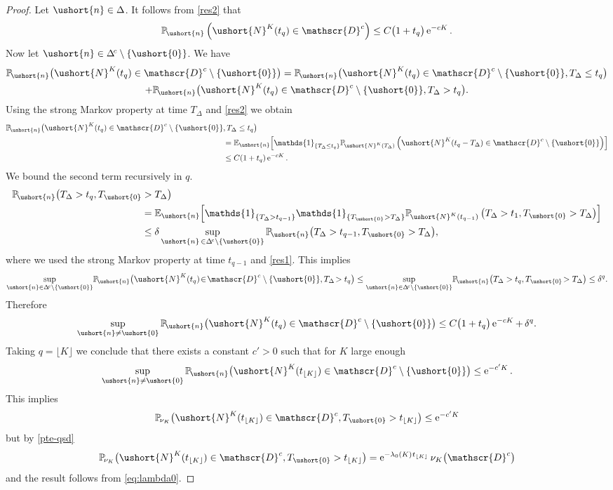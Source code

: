\documentclass[JEP,XML,SOM,Unicode]{cedram}
\newcommand{\scaleto}[2]{#1}
\let\backslash\setminus
\let\mathcal\mathscr
\numberwithin{equation}{section}
\theoremstyle{plain}
\theoremstyle{definition}
\newcommand{\proba}{{\mathbb{P}}}
\newcommand{\E}{{\mathbb{E}}}
\newcommand{\un}{\mathds{1}}
\newcommand{\vecn}{\ushort{n}}
\newcommand{\veczer}{\ushort{0}}
\newcommand{\sDelta}{\Delta}
\newcommand{\ssDelta}{\Delta}
\newcommand{\leproc}{\ushort{N}^{K}}
\newcommand{\sleproc}{\ushort{N}^{K}}
\newcommand{\nuk}{\nu_{K}}\let\snuk\nuk
\newcommand{\e}{\operatorname{e}}
\begin{document}
\begin{proof}
Let $\vecn\in \Delta$. It follows from \eqref{res2} that
\[
\proba_{\!\vecn}\left(\leproc(t_q)\in \mathcal{D}^{c}\right)\le C\bigl(1+t_{q}\bigr)\e^{-cK}.
\]
Now let $\vecn\in \Delta^{\!c}\backslash\{\veczer\}$. We have
\begin{multline*}
\proba_{\!\vecn}\bigl(\leproc(t_q)\in \mathcal{D}^{c}\backslash \{\veczer\}\bigr)=
\proba_{\!\vecn}\bigl(\leproc(t_q)\in \mathcal{D}^{c}\backslash \{\veczer\},T_{\sDelta}\le t_{q}\bigr)\\
+
\proba_{\!\vecn}\bigl(\leproc(t_q)\in \mathcal{D}^{c}\backslash \{\veczer\},T_{\sDelta}>t_{q}\bigr).
\end{multline*}
Using the strong Markov property at time $T_{\sDelta}$ and \eqref{res2} we obtain
\begin{align*}
\proba_{\!\vecn}\bigl(\leproc(t_q)\in \mathcal{D}^{c}\backslash\{\veczer\}&,T_{\sDelta}\le t_{q}\bigr)\\
&= \E_{\vecn} \Bigl[\un_{\{T_{\ssDelta}\leq t_q\}} \proba_{\!\sleproc(T_{\ssDelta})}\left(\leproc(t_q-T_{\sDelta})\in \mathcal{D}^{c}\backslash \{\veczer\}\right)\Bigr]\\
& \leq C(1+t_q) \e^{-c K}.
\end{align*}
We bound the second term recursively in $q$.
\begin{align*}
\proba_{\!\vecn}\bigl(T_{\sDelta}>t_{q},T_{\veczer}&>T_{\sDelta}\bigr)\\
& = \E_{\vecn} \Bigl[\un_{\{T_{\ssDelta}>t_{q-1}\}} \un_{\{T_{\veczer}>T_{\ssDelta}\}}
\proba_{\!\sleproc(t_{q-1})}\left(T_{\sDelta}>t_1, T_{\veczer}>T_{\sDelta}\right)\Bigr]\\
& \leq \delta \sup_{\vecn\, \in \Delta^{\!c}\backslash \{\veczer\}}\proba_{\!\vecn}\bigl(T_{\sDelta}>t_{q-1},T_{\veczer}>T_{\sDelta}\bigr),
\end{align*}
where we used the strong Markov property at time $t_{q-1}$ and \eqref{res1}.
This implies
\[
\sup_{\vecn \in \Delta^{\!c}\backslash \{\veczer\}}\!\proba_{\!\vecn}\bigl(\leproc(t_q)\!\in\! \mathcal{D}^{c}
\backslash \{\veczer\},T_{\sDelta}\!>t_{q}\bigr)
\le
\sup_{\vecn \in \Delta^{\!c}\backslash \{\veczer\}} \!\proba_{\!\vecn}\bigl(T_{\sDelta}>t_{q},T_{\veczer}\!>T_{\sDelta}\bigr) \le \delta^{q}.
\]
Therefore
\[
\sup_{\vecn\neq\veczer}\proba_{\!\vecn}\bigl(\leproc(t_q)\in \mathcal{D}^{c}\backslash \{\veczer\}\bigr)\le
C\bigl(1+t_{q}\bigr)\e^{-c K}+\,\delta^{q}.
\]
Taking $q=\lfloor K \rfloor$ we conclude that there exists a constant $c'>0$ such that for $K$ large enough
\[
\sup_{\vecn\neq \veczer}\proba_{\!\vecn}\bigl(\leproc(t_{{ \lfloor K \rfloor}})\in \mathcal{D}^{c}
\backslash \{\veczer\}\bigr)\le\e^{-c' K}.
\]
This implies
\[
\proba_{\!\snuk}\bigl(\leproc(t_{{ \lfloor K \rfloor}})\in \mathcal{D}^{c},T_{\veczer}
>t_{{ \lfloor K \rfloor}}\bigr)\le \e^{-c' K}
\]
but by \eqref{pte-qsd}
\[
\proba_{\!\snuk}\bigl(\leproc(t_{{ \lfloor K \rfloor}})\in \mathcal{D}^{c},T_{\veczer}>t_{{ \lfloor K \rfloor}}\bigr)=
\e^{-\lambda_{0}(K)\hspace{.4pt} t_{\scaleto{\lfloor K \rfloor}{4pt}}}\nuk\bigl(\mathcal{D}^{c}\bigr)
\]
and the result follows from \eqref{eq:lambda0}.
\end{proof}
\end{document}
